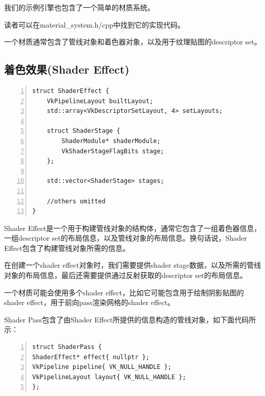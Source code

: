 \documentclass{ctexart}
\begin{document}
我们的示例引擎也包含了一个简单的材质系统。

读者可以在material\_system.h/cpp中找到它的实现代码。

一个材质通常包含了管线对象和着色器对象，以及用于纹理贴图的descriptor set。

\subsection{着色效果(Shader Effect)}

\begin{lstlisting}[language={[ANSI]C},keywordstyle=\color{blue!70},commentstyle=\color{red!50!green!50!blue!50},frame=shadowbox, rulesepcolor=\color{red!20!green!20!blue!20},basicstyle=\small,numbers=left, numberstyle=\tiny,breaklines=true]
struct ShaderEffect {
	VkPipelineLayout builtLayout;
	std::array<VkDescriptorSetLayout, 4> setLayouts;

	struct ShaderStage {
		ShaderModule* shaderModule;
		VkShaderStageFlagBits stage;
	};

	std::vector<ShaderStage> stages;

	//others omitted
}
\end{lstlisting}

Shader Effect是一个用于构建管线对象的结构体，通常它包含了一组着色器信息，一组descriptor set的布局信息，以及管线对象的布局信息。换句话说，Shader Effect包含了构建管线对象所需的信息。

在创建一个shader effect对象时，我们需要提供shader stage数据，以及所需的管线对象的布局信息，最后还需要提供通过反射获取的descriptor set的布局信息。

一个材质可能会使用多个shader effect，比如它可能包含用于绘制阴影贴图的shader effect，用于前向pass渲染网格的shader effect。

Shader Pass包含了由Shader Effect所提供的信息构造的管线对象，如下面代码所示：

\begin{lstlisting}[language={[ANSI]C},keywordstyle=\color{blue!70},commentstyle=\color{red!50!green!50!blue!50},frame=shadowbox, rulesepcolor=\color{red!20!green!20!blue!20},basicstyle=\small,numbers=left, numberstyle=\tiny,breaklines=true]
struct ShaderPass {
ShaderEffect* effect{ nullptr };
VkPipeline pipeline{ VK_NULL_HANDLE };
VkPipelineLayout layout{ VK_NULL_HANDLE };
};
\end{lstlisting}
\end{document}
